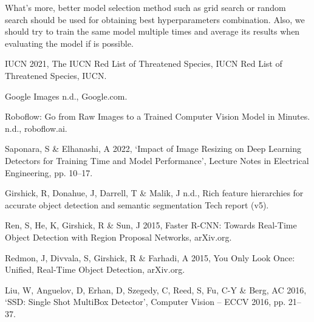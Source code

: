 \documentclass[runningheads]{llncs}
\begin{document}
What's more, better model selection method such as grid search or random search should be used for obtaining best hyperparameters combination. Also, we should try to train the same model multiple times and average its results when evaluating the model if is possible. 



\begin{thebibliography}{8}
IUCN 2021, The IUCN Red List of Threatened Species, IUCN Red List of Threatened Species, IUCN.

Google Images n.d., Google.com.

Roboflow: Go from Raw Images to a Trained Computer Vision Model in Minutes. n.d., roboflow.ai.

Saponara, S \& Elhanashi, A 2022, `Impact of Image Resizing on Deep Learning Detectors for Training Time and Model Performance', Lecture Notes in Electrical Engineering, pp. 10–17.

Girshick, R, Donahue, J, Darrell, T \& Malik, J n.d., Rich feature hierarchies for accurate object detection and semantic segmentation Tech report (v5).

Ren, S, He, K, Girshick, R \& Sun, J 2015, Faster R-CNN: Towards Real-Time Object Detection with Region Proposal Networks, arXiv.org.

Redmon, J, Divvala, S, Girshick, R \& Farhadi, A 2015, You Only Look Once: Unified, Real-Time Object Detection, arXiv.org.

Liu, W, Anguelov, D, Erhan, D, Szegedy, C, Reed, S, Fu, C-Y \& Berg, AC 2016, `SSD: Single Shot MultiBox Detector', Computer Vision – ECCV 2016, pp. 21–37.

\end{thebibliography}
\end{document}
